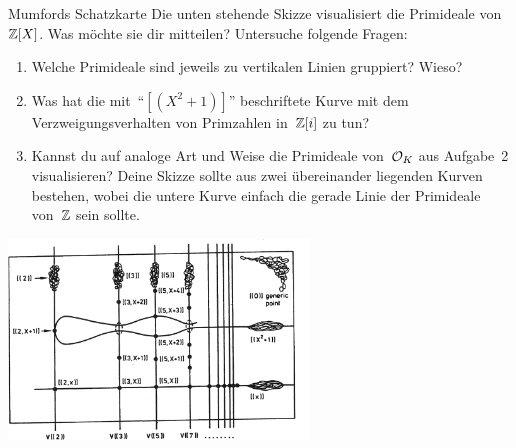 \documentclass{uebblatt}
\begin{document}
\begin{aufgabe}{Mumfords Schatzkarte}
Die unten stehende Skizze visualisiert die Primideale von~$\mathbb{Z}[X]$.
Was möchte sie dir mitteilen? Untersuche folgende Fragen:
\begin{enumerate}
\item Welche Primideale sind jeweils zu vertikalen Linien gruppiert? Wieso?
\item Was hat die mit~"`$[(X^2+1)]$"' beschriftete Kurve mit dem
Verzweigungsverhalten von Primzahlen in~$\mathbb{Z}[i]$ zu tun?
\item Kannst du auf analoge Art und Weise die Primideale von~$\mathcal{O}_K$ aus
Aufgabe~2 visualisieren? Deine Skizze sollte aus zwei übereinander liegenden
Kurven bestehen, wobei die untere Kurve einfach die gerade Linie der Primideale
von~$\mathbb{Z}$ sein sollte.
\end{enumerate}
\centering\includegraphics[width=0.6\textwidth]{images/mumfords-treasure-map}\par
\end{aufgabe}
\end{document}
